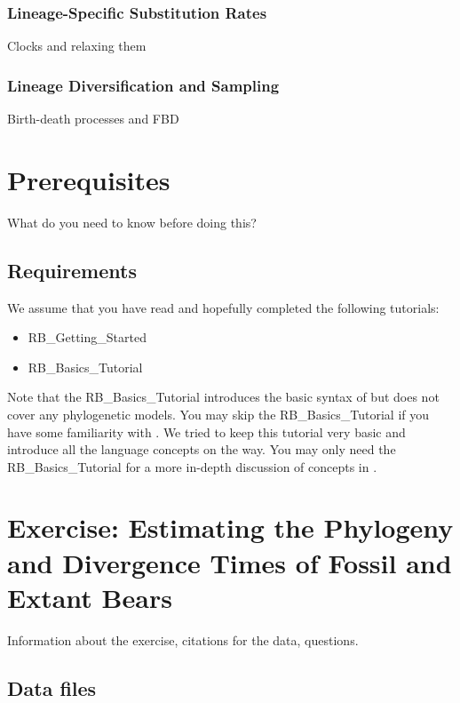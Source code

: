\subsubsection{Lineage-Specific Substitution Rates}

Clocks \citep{Zuckerkandl1962} and relaxing them 

\subsubsection{Lineage Diversification and Sampling}

Birth-death processes and FBD

\section{Prerequisites}

What do you need to know before doing this?

\subsection{Requirements}
We assume that you have read and hopefully completed the following tutorials:
\begin{itemize}
\item RB\_Getting\_Started
\item RB\_Basics\_Tutorial
\end{itemize}
Note that the RB\_Basics\_Tutorial introduces the basic syntax of \Rev but does not cover any phylogenetic models.
You may skip the RB\_Basics\_Tutorial if you have some familiarity with \R.
We tried to keep this tutorial very basic and introduce all the language concepts on the way.
You may only need the RB\_Basics\_Tutorial for a more in-depth discussion of concepts in \Rev.




\section{Exercise: Estimating the Phylogeny and Divergence Times of Fossil and Extant Bears}\label{sect:RB-ExerciseMain}

Information about the exercise, citations for the data, questions. 

\subsection{Data files}\label{subsect:RB-DataFiles}

